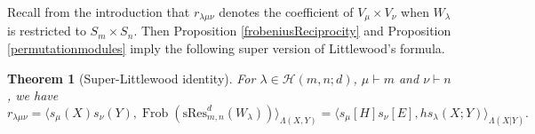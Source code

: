 \documentclass[12pt,reqno]{amsart}
\newtheorem{theorem}{Theorem}[section]
\theoremstyle{definition}
\theoremstyle{remark}
\newcommand{\Hi}{\mathcal{H}(m,n;d)}
\newcommand{\res}{\mathrm{sRes}_{m,n}^{d}}
\DeclareMathOperator{\fr}{{Frob}}
\begin{document}

Recall from the introduction that $r_{\lambda\mu\nu}$ denotes the coefficient of $V_{\mu}\times V_{\nu}$ when $W_{\lambda}$ is  restricted to $S_{m}\times S_{n}$. Then Proposition \ref{frobeniusReciprocity} and Proposition \ref{permutationmodules} imply the following super version of Littlewood's formula.
\begin{theorem}[Super-Littlewood identity]\label{Littlewood}
    For $\lambda\in\Hi$, $\mu\vdash m$ and $\nu\vdash n$, we have
    $$r_{\lambda\mu\nu}=\langle s_{\mu}(X)s_{\nu}(Y), \fr(\res(W_{\lambda}))\rangle_{\Lambda(X,Y)} = \langle  s_{\mu}[H]s_{\nu}[E], hs_{\lambda}(X;Y) \rangle_{\Lambda(X|Y)}.$$ 
\end{theorem}
\end{document}
